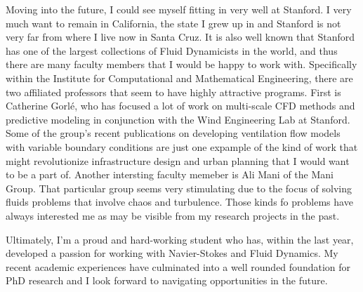 \documentclass{article}
\begin{document}
Moving into the future, I could see myself fitting in very well at Stanford. I very much want to remain in California, the state I grew up in and Stanford is not very far from where I live now in Santa Cruz. It is also well known that Stanford has one of the largest collections of Fluid Dynamicists in the world, and thus there are many faculty members that I would be happy to work with. Specifically within the Institute for Computational and Mathematical Engineering, there are two affiliated professors that seem to have highly attractive programs. First is Catherine Gorl\'e, who has focused a lot of work on multi-scale CFD methods and predictive modeling in conjunction with the Wind Engineering Lab at Stanford. Some of the group's recent publications on developing ventilation flow models with variable boundary conditions are just one expample of the kind of work that might revolutionize infrastructure design and urban planning that I would want to be a part of. Another intersting faculty memeber is Ali Mani of the Mani Group. That particular group seems very stimulating due to the focus of solving fluids problems that involve chaos and turbulence. Those kinds fo problems have always interested me as may be visible from my research projects in the past. 

Ultimately, I'm a proud and hard-working student who has, within the last year, developed a passion for working with Navier-Stokes and Fluid Dynamics. My recent academic experiences have culminated into a well rounded foundation for PhD research and I look forward to navigating opportunities in the future. 

\end{document}

